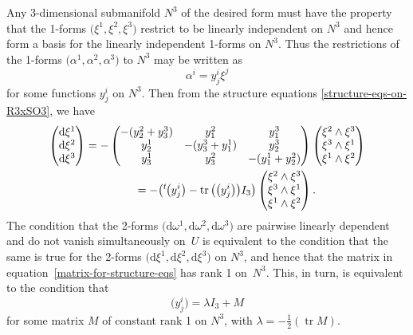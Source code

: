 \documentclass[pdftex]{sigma}
\numberwithin{equation}{section}
\renewcommand{\d}{\mathrm{d}}%
\DeclareMathOperator{\tr}{tr}
\begin{document}
Any 3-dimensional submanifold $N^3$ of the desired form must have the property that the 1-forms $\big(\xi^1, \xi^2, \xi^3\big)$ restrict to be linearly independent on $N^3$ and hence form a basis for the linearly independent 1-forms on $N^3$. Thus the restrictions of the 1-forms $\big(\alpha^1, \alpha^2, \alpha^3\big)$ to $N^3$ may be written as
\[ \alpha^i = y^i_j \xi^j \]
for some functions $y^i_j$ on $N^3$. Then from the structure equations \eqref{structure-eqs-on-R3xSO3}, we have
\begin{gather}
\begin{pmatrix} \d\xi^1 \\ \d\xi^2 \\ \d\xi^3 \end{pmatrix} =
 -\begin{pmatrix}
-(y^2_2 + y^3_3) & y^2_1 & y^3_1 \\
y^1_2 & -(y^3_3 + y^1_1) & y^3_2 \\
y^1_3 & y^2_3 & -(y^1_1 + y^2_2) \end{pmatrix}
\begin{pmatrix} \xi^2 \wedge \xi^3 \\ \xi^3 \wedge \xi^1 \\ \xi^1 \wedge \xi^2 \end{pmatrix} \nonumber\\
\hphantom{\begin{pmatrix} \d\xi^1 \\ \d\xi^2 \\ \d\xi^3 \end{pmatrix}}{}
 = -\big({}^t\hskip-1pt\big(y^i_j\big) - \tr \big(\big(y^i_j\big)\big) I_3 \big) \begin{pmatrix} \xi^2 \wedge \xi^3 \\ \xi^3 \wedge \xi^1 \\ \xi^1 \wedge \xi^2 \end{pmatrix} .
\label{matrix-for-structure-eqs}
\end{gather}
The condition that the 2-forms $\big(\d\omega^1, \d \omega^2, \d\omega^3\big)$ are pairwise linearly dependent and do not vanish simultaneously on~$U$ is equivalent to the condition that the same is true for the 2-forms $\big(\d\xi^1, \d \xi^2, \d\xi^3\big)$ on $N^3$, and hence that the matrix in equation~\eqref{matrix-for-structure-eqs} has rank 1 on~$N^3$. This, in turn, is equivalent to the condition that
\[ \big(y^i_j\big) = \lambda I_3 + M \]
for some matrix $M$ of constant rank 1 on $N^3$, with $\lambda = -\tfrac{1}{2} (\tr M)$.
\end{document}
